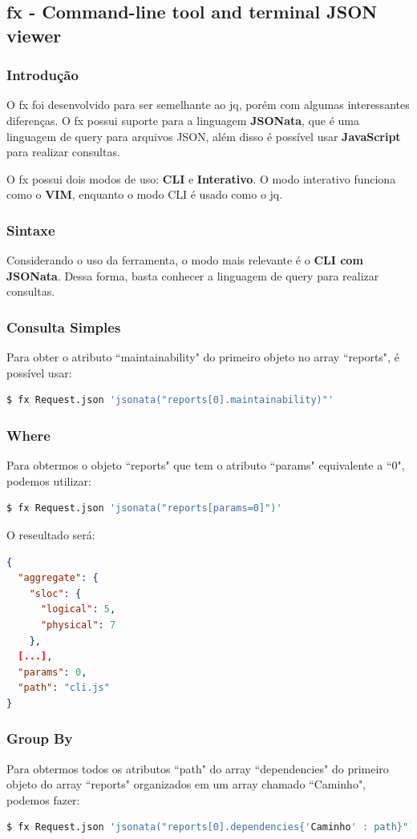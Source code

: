 \documentclass[a4paper, 12pt] {article}
\begin{document}
		\subsection{fx - Command-line tool and terminal JSON viewer}
			\subsubsection{Introdução}
				O fx foi desenvolvido para ser semelhante ao jq, porém com algumas interessantes diferenças. O fx possui suporte para a linguagem \textbf{JSONata}, que é uma linguagem de query para arquivos JSON, além disso é possível usar \textbf{JavaScript} para realizar consultas.

				O fx possui dois modos de uso: \textbf{CLI} e \textbf{Interativo}. O modo interativo funciona como o \textbf{VIM}, enquanto o modo CLI é usado como o jq.
			\subsubsection{Sintaxe}
				Considerando o uso da ferramenta, o modo mais relevante é o \textbf{CLI com JSONata}. Dessa forma, basta conhecer a linguagem de query para realizar consultas.
			\subsubsection{Consulta Simples}
				Para obter o atributo “maintainability" do primeiro objeto no array “reports", é possível usar:
\begin{lstlisting}[language=bash]
$ fx Request.json 'jsonata("reports[0].maintainability)"'
\end{lstlisting}
			\subsubsection{Where}
				Para obtermos o objeto “reports" que tem o atributo “params" equivalente a “0", podemos utilizar:
\begin{lstlisting}[language=bash]
$ fx Request.json 'jsonata("reports[params=0]")'
\end{lstlisting}
				
				O reseultado será:
\begin{lstlisting}[language=json,firstnumber=1]
{
  "aggregate": {
    "sloc": {
      "logical": 5,
      "physical": 7
    },
  [...],
  "params": 0,
  "path": "cli.js"
}
\end{lstlisting}
			\subsubsection{Group By}
				Para obtermos todos os atributos “path" do array “dependencies" do primeiro objeto do array “reports" organizados em um array chamado “Caminho", podemos fazer:
\begin{lstlisting}[language=bash]
$ fx Request.json 'jsonata("reports[0].dependencies{'Caminho' : path}")'
\end{lstlisting}
\end{document}
